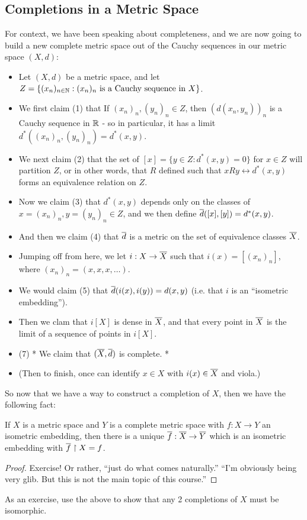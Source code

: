 \subsection{Completions in a Metric Space}

For context, we have been speaking about completeness, and we are now going to build a new complete metric space out of the Cauchy sequences in our metric space $(X,d)$:
\begin{itemize}
    \item Let $(X,d)$ be a metric space, and let $Z=\{(x_n)_{n\in \mathbb{N}}:(x_n)_n \text{ is a Cauchy sequence in }X\}$.
    \item We first claim (1) that If $(x_n)_n, (y_n)_n\in Z$, then $(d(x_n, y_n))_n$ is a Cauchy sequence in $\mathbb{R}$ - so in particular, it has a limit $d^*((x_n)_n, (y_n)_n)=d^*(x,y)$.
    \item We next claim (2) that the set of $[x]=\{y\in Z: d^*(x,y)=0\}$ for $x\in Z$ will partition $Z$, or in other words, that $R$ defined such that $xRy\leftrightarrow d^*(x,y)$ forms an equivalence relation on $Z$.
    \item Now we claim (3) that $d^*(x,y)$ depends only on the classes of $x=(x_n)_n, y=(y_n)_n\in Z$, and we then define $\Bar{d}([x], [y])=d^*(x,y)$.
    \item And then we claim (4) that $\Bar{d}$ is a metric on the set of equivalence classes $\Bar{X}$.
    \item Jumping off from here, we let $i:X\rightarrow \Bar{X}$ such that $i(x)=[(x_n)_n]$, where $(x_n)_n=(x,x,x,\ldots)$.
    \item We would claim (5) that $\Bar{d}(i(x), i(y))=d(x,y)$ (i.e. that $i$ is an ``isometric embedding'').
    \item Then we clam that $i[X]$ is dense in $\Bar{X}$, and that every point in $\Bar{X}$ is the limit of a sequence of points in $i[X]$.
    \item (7) * We claim that $(\Bar{X}, \bar{d})$ is complete. *
    \item (Then to finish, once can identify $x\in X$ with $i(x)\in \Bar{X}$ and viola.)
\end{itemize}
So now that we have a way to construct a completion of $X$, then we have the following fact:
\begin{boxlemma}
    If $X$ is a metric space and $Y$ is a complete metric space with $f:X\rightarrow Y$ an isometric embedding, then there is a unique $\Bar{f}:\Bar{X}\rightarrow \Bar{Y}$ which is an isometric embedding with $\Bar{f}\restriction X=f$.
\end{boxlemma}
\begin{proof}
    Exercise! Or rather, ``just do what comes naturally.'' ``I'm obviously being very glib. But this is not the main topic of this course.''
\end{proof}
\begin{remark}
    As an exercise, use the above to show that any 2 completions of $X$ must be isomorphic.
\end{remark}

